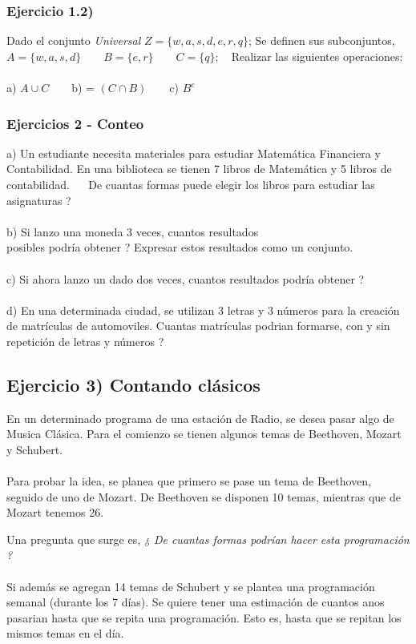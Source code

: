 \documentclass[11pt, a4paper]{article}
\begin{document}
\subsubsection*{ Ejercicio 1.2) } 
Dado el conjunto \textit{Universal} $ Z = \{  w,a,s,d,e,r,q  \}$; Se definen sus subconjuntos, $A = \{ w,a,s,d \}$ ~ ~ $B = \{ e,r \}$ ~ ~ $C = \{ q \}$; ~ Realizar las siguientes operaciones: \\ \\ 

a) $ A \cup C $ ~ ~ b) = $ (C \cap B) $ ~ ~ c) $ B^c $ 


\subsubsection*{ Ejercicios 2 - Conteo  }

a) Un estudiante necesita materiales para estudiar Matem\'atica Financiera y Contabilidad. En una biblioteca se tienen 7 libros de Matem\'atica y 5 libros de contabilidad.~ ~ De cuantas formas puede elegir los libros para estudiar las asignaturas ? \\ \\
b) Si lanzo una moneda 3 veces, cuantos resultados \\ posibles podr\'ia obtener ? Expresar estos resultados como un conjunto. \\ \\
c) Si ahora lanzo un dado dos veces, cuantos resultados podr\'ia obtener ? \\ \\
d) En una determinada ciudad, se utilizan 3 letras y 3 n\'umeros para la creaci\'on de matr\'iculas de automoviles. Cuantas matr\'iculas podrian formarse, con y sin repetici\'on de letras y n\'umeros ? 

\subsection*{  Ejercicio 3) Contando cl\'asicos }

En un determinado programa de una  estaci\'on de Radio, se desea pasar algo de Musica Cl\'asica. Para el comienzo se tienen algunos temas de Beethoven, Mozart y Schubert. \\ \\
Para probar la idea, se planea que primero se pase un tema de Beethoven, seguido de uno de Mozart. De Beethoven se disponen 10 temas, mientras que de Mozart tenemos 26. 

Una pregunta que surge es, \textit{¿ De cuantas formas podr\'ian hacer esta programaci\'on ? } \\ \\ 
Si adem\'as se agregan 14 temas de Schubert y se plantea una programaci\'on semanal (durante los 7 d\'ias). Se quiere tener una estimaci\'on de cuantos anos pasarian hasta que se repita una programaci\'on. Esto es, hasta que se repitan los mismos temas en el d\'ia. 
\end{document}
